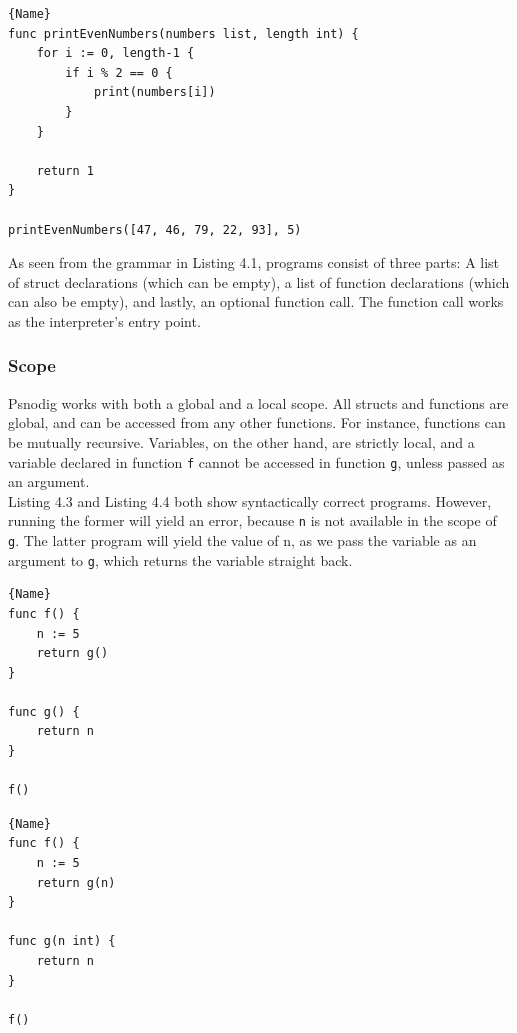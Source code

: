 \begin{lstlisting}[caption={A syntactically correct program with a subtle logical error}, captionpos=b]{Name}
func printEvenNumbers(numbers list, length int) {
    for i := 0, length-1 {
        if i % 2 == 0 {
            print(numbers[i])
        }
    }

    return 1
}

printEvenNumbers([47, 46, 79, 22, 93], 5)
\end{lstlisting}


As seen from the grammar in Listing 4.1, programs consist of three parts: A list of struct declarations (which can be empty), a list of function declarations (which can also be empty), and lastly, an optional function call. The function call works as the interpreter's entry point.

\subsubsection{Scope}

Psnodig works with both a global and a local scope. All structs and functions are global, and can be accessed from any other functions. For instance, functions can be mutually recursive. Variables, on the other hand, are strictly local, and a variable declared in function \texttt{f} cannot be accessed in function \texttt{g}, unless passed as an argument. \hfill \\

Listing 4.3 and Listing 4.4 both show syntactically correct programs. However, running the former will yield an error, because \texttt{n} is not available in the scope of \texttt{g}. The latter program will yield the value of {n}, as we pass the variable as an argument to \texttt{g}, which returns the variable straight back. \hfill \\

\begin{minipage}{.45\textwidth}
\begin{lstlisting}[caption=Code with error, captionpos=b]{Name}
func f() {
    n := 5
    return g()
}

func g() {
    return n
}

f()
\end{lstlisting}
\end{minipage}\hfill
\begin{minipage}{.45\textwidth}
\begin{lstlisting}[caption=Code without error, captionpos=b]{Name}
func f() {
    n := 5
    return g(n)
}

func g(n int) {
    return n
}

f()
\end{lstlisting}
\end{minipage}

